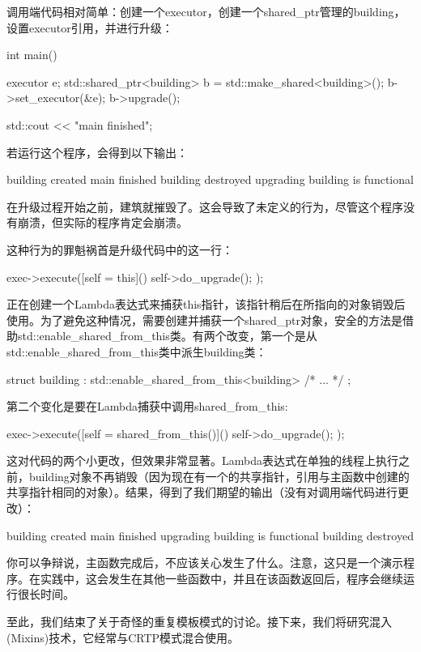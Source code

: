 调用端代码相对简单：创建一个executor，创建一个shared\_ptr管理的building，设置executor引用，并进行升级：

\begin{cpp}
int main()
{
	executor e;
	std::shared_ptr<building> b =
		std::make_shared<building>();
	b->set_executor(&e);
	b->upgrade();
	
	std::cout << "main finished\n";
}
\end{cpp}

若运行这个程序，会得到以下输出：

\begin{shell}
building created
main finished
building destroyed
upgrading
building is functional
\end{shell}

在升级过程开始之前，建筑就摧毁了。这会导致了未定义的行为，尽管这个程序没有崩溃，但实际的程序肯定会崩溃。

这种行为的罪魁祸首是升级代码中的这一行：

\begin{cpp}
exec->execute([self = this]() {
	self->do_upgrade();
});
\end{cpp}

正在创建一个Lambda表达式来捕获this指针，该指针稍后在所指向的对象销毁后使用。为了避免这种情况，需要创建并捕获一个shared\_ptr对象，安全的方法是借助std::enable\_shared\_from\_this类。有两个改变，第一个是从std::enable\_shared\_from\_this类中派生building类：

\begin{cpp}
struct building : std::enable_shared_from_this<building>
{
	/* ... */
};
\end{cpp}

第二个变化是要在Lambda捕获中调用shared\_from\_this:

\begin{cpp}
exec->execute([self = shared_from_this()]() {
	self->do_upgrade();
});
\end{cpp}

这对代码的两个小更改，但效果非常显著。Lambda表达式在单独的线程上执行之前，building对象不再销毁（因为现在有一个的共享指针，引用与主函数中创建的共享指针相同的对象）。结果，得到了我们期望的输出（没有对调用端代码进行更改）：

\begin{shell}
building created
main finished
upgrading
building is functional
building destroyed
\end{shell}

你可以争辩说，主函数完成后，不应该关心发生了什么。注意，这只是一个演示程序。在实践中，这会发生在其他一些函数中，并且在该函数返回后，程序会继续运行很长时间。

至此，我们结束了关于奇怪的重复模板模式的讨论。接下来，我们将研究混入(Mixins)技术，它经常与CRTP模式混合使用。





















